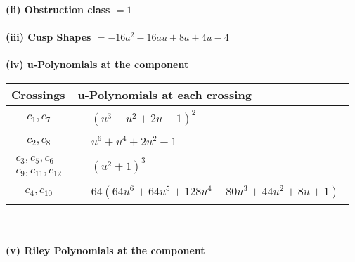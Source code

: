 \documentclass[1p]{elsarticle_modified}
\theoremstyle{definition}
\begin{document}
\flushleft \textbf{(ii) Obstruction class $= 1$}\\~\\
\flushleft \textbf{(iii) Cusp Shapes $= -16 a^2-16 a u+8 a+4 u-4$}\\~\\
\newpage\renewcommand{\arraystretch}{1}
\flushleft \textbf{(iv) u-Polynomials at the component}\newline \\
\begin{tabular}{m{50pt}|m{274pt}}
Crossings & \hspace{64pt}u-Polynomials at each crossing \\
\hline $$\begin{aligned}c_{1},c_{7}\end{aligned}$$&$\begin{aligned}
&(u^3- u^2+2 u-1)^2
\end{aligned}$\\
\hline $$\begin{aligned}c_{2},c_{8}\end{aligned}$$&$\begin{aligned}
&u^6+u^4+2 u^2+1
\end{aligned}$\\
\hline $$\begin{aligned}c_{3},c_{5},c_{6}\\c_{9},c_{11},c_{12}\end{aligned}$$&$\begin{aligned}
&(u^2+1)^3
\end{aligned}$\\
\hline $$\begin{aligned}c_{4},c_{10}\end{aligned}$$&$\begin{aligned}
&64(64 u^6+64 u^5+128 u^4+80 u^3+44 u^2+8 u+1)
\end{aligned}$\\
\hline
\end{tabular}\\~\\
\newpage\renewcommand{\arraystretch}{1}
\flushleft \textbf{(v) Riley Polynomials at the component}\newline \\
\end{document}
